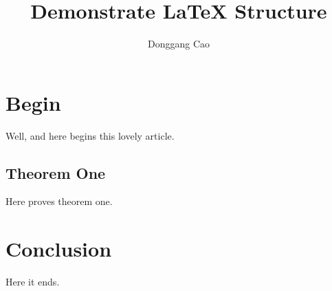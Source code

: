 \documentclass[a4paper,11pt]{article}
\author{Donggang Cao}
\title{Demonstrate \LaTeX {} Structure}
\begin{document}
\maketitle
\section{Begin}
Well, and here begins this lovely article.
\subsection{Theorem One}
Here proves theorem one.
\section{Conclusion}
Here it ends.
\end{document}
